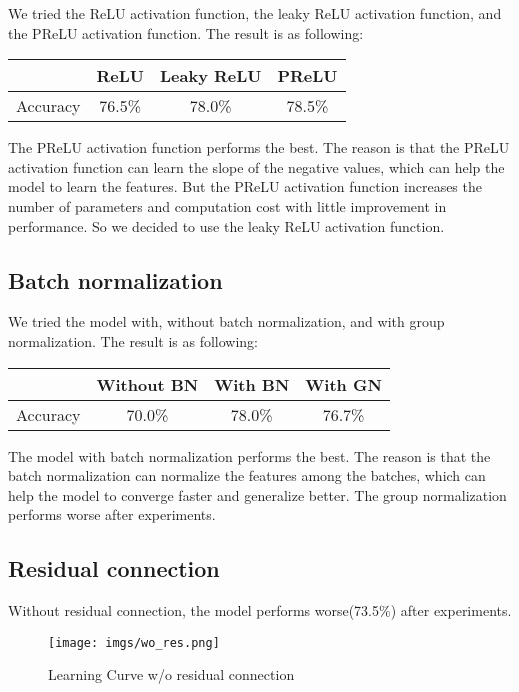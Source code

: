 \documentclass[12pt]{article}
\begin{document}
We tried the ReLU activation function, the leaky ReLU activation function, and the PReLU activation function. The result is as following:

\begin{table}[h]
\centering
\begin{tabular}{|c|c|c|c|}
\hline
 & ReLU & Leaky ReLU & PReLU \\
\hline
Accuracy & 76.5\% & 78.0\% & 78.5\% \\
\hline
\end{tabular}
\end{table}

The PReLU activation function performs the best. The reason is that the PReLU activation function can learn the slope of the negative values, which can help the model to learn the features. But the PReLU activation function increases the number of parameters and computation cost with little improvement in performance. So we decided to use the leaky ReLU activation function.

\subsection{Batch normalization}

We tried the model with, without batch normalization, and with group normalization. The result is as following:

\begin{table}[h]
\centering
\begin{tabular}{|c|c|c|c|}
\hline
 & Without BN & With BN & With GN \\
\hline
Accuracy & 70.0\% & 78.0\% & 76.7\% \\
\hline
\end{tabular}
\end{table}

The model with batch normalization performs the best. The reason is that the batch normalization can normalize the features among the batches, which can help the model to converge faster and generalize better. The group normalization performs worse after experiments.

\subsection{Residual connection}

Without residual connection, the model performs worse(73.5\%) after experiments.

\begin{figure}[!htbp]
    \centering
    \texttt{[image: imgs/wo\_res.png]}
    \caption{Learning Curve  w/o residual connection}
    \label{fig:wores}
\end{figure}
\FloatBarrier
\end{document}
